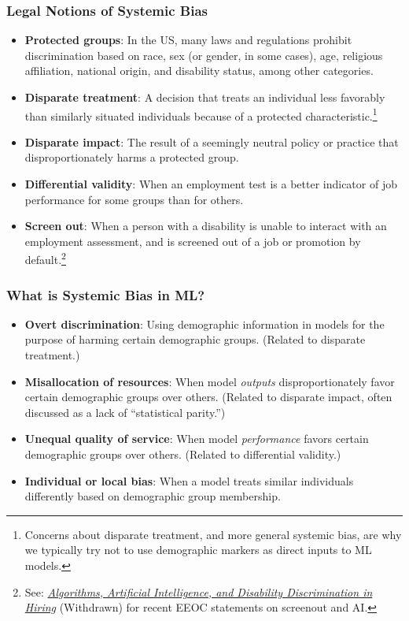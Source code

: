\documentclass[11pt,aspectratio=169,hyperref={colorlinks}]{beamer}
\begin{document}
		\begin{frame}				
			
			\frametitle{Legal Notions of Systemic Bias}		
			
			\begin{itemize}\small
				\item \textbf{Protected groups}: In the US, many laws and regulations prohibit discrimination based on race, sex (or gender, in some cases), age, religious affiliation, national origin, and disability status, among other categories. 
				\item \textbf{Disparate treatment}: A decision that treats an individual less favorably than similarly situated individuals because of a protected characteristic.\footnote{Concerns about disparate treatment, and more general systemic bias, are why we typically try not to use demographic markers as direct inputs to ML models.}
				\item \textbf{Disparate impact}: The result of a seemingly neutral policy or practice that disproportionately harms a protected group. 
				\item \textbf{Differential validity}: When an employment test is a better indicator of job performance for some groups than for others.
				\item \textbf{Screen out}: When a person with a disability is unable to interact with an employment assessment, and is screened out of a job or promotion by default.\footnote{See: \href{https://web.archive.org/web/20221119025433/https://www.ada.gov/resources/ai-guidance/}{\textit{Algorithms, Artificial Intelligence, and Disability Discrimination in Hiring}} (Withdrawn) for recent EEOC statements on screenout and AI.} 
			\end{itemize}
		\end{frame}
		
		\begin{frame}				

			\frametitle{What is Systemic Bias in ML?}

				\begin{itemize}
					\item \textbf{Overt discrimination}: Using demographic information in models for the purpose of harming certain demographic groups. (Related to disparate treatment.)
					\item \textbf{Misallocation of resources}: When model \textit{outputs} disproportionately favor certain demographic groups over others. (Related to disparate impact, often discussed as a lack of ``statistical parity.'') 
					\item \textbf{Unequal quality of service}:  When model \textit{performance} favors certain demographic groups over others. (Related to differential validity.)
					\item \textbf{Individual or local bias}: When a model treats similar individuals differently based on demographic group membership. 
				\end{itemize}

		\end{frame}
\end{document}
